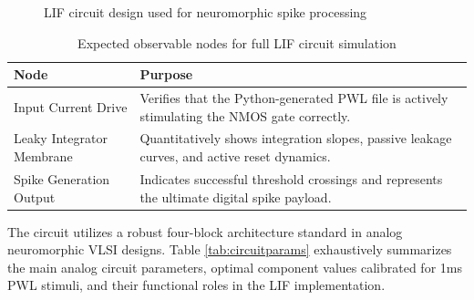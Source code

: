 \begin{figure}[H]
\centering
\caption{LIF circuit design used for neuromorphic spike processing}
\label{fig:lifcircuit}
\end{figure}

\begin{table}[H]
\centering
\caption{Expected observable nodes for full LIF circuit simulation}
\label{tab:lifnodes}
\begin{tabular}{|p{}|p{}|}
\hline
\textbf{Node} & \textbf{Purpose} \\
\hline
Input Current Drive & Verifies that the Python-generated PWL file is actively stimulating the NMOS gate correctly. \\
\hline
Leaky Integrator Membrane & Quantitatively shows integration slopes, passive leakage curves, and active reset dynamics. \\
\hline
Spike Generation Output & Indicates successful threshold crossings and represents the ultimate digital spike payload. \\
\hline
\end{tabular}
\end{table}

The circuit utilizes a robust four-block architecture standard in analog neuromorphic VLSI designs. Table \ref{tab:circuitparams} exhaustively summarizes the main analog circuit parameters, optimal component values calibrated for 1ms PWL stimuli, and their functional roles in the LIF implementation.

